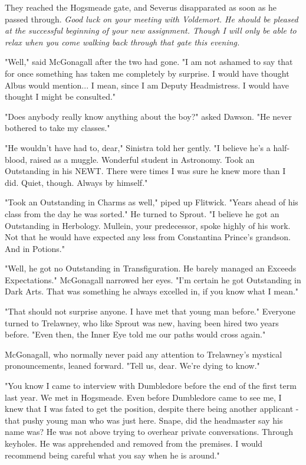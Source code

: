 \documentclass[a4paper,11pt]{article}
\begin{document}
They reached the Hogsmeade gate, and Severus disapparated as soon as he passed through. \emph{Good luck on your meeting with Voldemort. He should be pleased at the successful beginning of your new assignment. Though I will only be able to relax when you come walking back through that gate this evening.}

"Well," said McGonagall after the two had gone. "I am not ashamed to say that for once something has taken me completely by surprise. I would have thought Albus would mention... I mean, since I am Deputy Headmistress. I would have thought I might be consulted."

"Does anybody really know anything about the boy?" asked Dawson. "He never bothered to take my classes."

"He wouldn't have had to, dear," Sinistra told her gently. "I believe he's a half-blood, raised as a muggle. Wonderful student in Astronomy. Took an Outstanding in his NEWT. There were times I was sure he knew more than I did. Quiet, though. Always by himself."

"Took an Outstanding in Charms as well," piped up Flitwick. "Years ahead of his class from the day he was sorted." He turned to Sprout. "I believe he got an Outstanding in Herbology. Mullein, your predecessor, spoke highly of his work. Not that he would have expected any less from Constantina Prince's grandson. And in Potions."

"Well, he got no Outstanding in Transfiguration. He barely managed an Exceeds Expectations." McGonagall narrowed her eyes. "I'm certain he got Outstanding in Dark Arts. That was something he always excelled in, if you know what I mean."

"That should not surprise anyone. I have met that young man before." Everyone turned to Trelawney, who like Sprout was new, having been hired two years before. "Even then, the Inner Eye told me our paths would cross again."

McGonagall, who normally never paid any attention to Trelawney's mystical pronouncements, leaned forward. "Tell us, dear. We're dying to know."

"You know I came to interview with Dumbledore before the end of the first term last year. We met in Hogsmeade. Even before Dumbledore came to see me, I knew that I was fated to get the position, despite there being another applicant - that pushy young man who was just here. Snape, did the headmaster say his name was? He was not above trying to overhear private conversations. Through keyholes. He was apprehended and removed from the premises. I would recommend being careful what you say when he is around."
\end{document}
